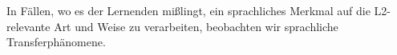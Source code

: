 In Fällen, wo es der Lernenden mißlingt, ein sprachliches Merkmal auf die L2-relevante Art und Weise zu verarbeiten, beobachten wir sprachliche Transferphänomene.












